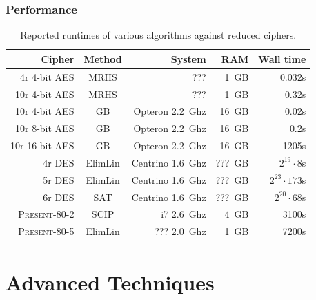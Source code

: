 \documentclass[9pt]{beamer}
\newcommand{\PRESENT}{\textsc{Present}\xspace}
\begin{document}
\begin{frame}
\frametitle{Performance} 

\begin{table}[htbp]
\begin{center}
\begin{tabular}{|r|c|r|r|r|}
\hline
Cipher & Method & System & RAM & Wall time\\
\hline
 4r 4-bit AES & MRHS  & ??? & 1~GB& 0.032s\\
10r 4-bit AES & MRHS  & ??? & 1~GB& 0.32s\\
10r 4-bit AES & GB & Opteron 2.2~Ghz & 16~GB & 0.02s\\
10r 8-bit AES  & GB & Opteron 2.2~Ghz & 16~GB & 0.2s\\
10r 16-bit AES & GB & Opteron 2.2~Ghz & 16~GB & 1205s\\
\hline
4r DES       & ElimLin  & Centrino 1.6~Ghz & ???~GB & $2^{19} \cdot 8$s\\
5r DES       & ElimLin  & Centrino 1.6~Ghz & ???~GB & $2^{23} \cdot 173$s\\
6r DES       & SAT  & Centrino 1.6~Ghz & ???~GB & $2^{20} \cdot 68$s\\
\hline
\PRESENT-80-2 & SCIP & i7 2.6~Ghz & 4~GB & 3100s \\
\PRESENT-80-5 & ElimLin & ??? 2.0~Ghz & 1~GB & 7200s \\
\hline
\end{tabular}
\end{center}
\caption{Reported runtimes of various algorithms against reduced ciphers.}
\label{tab:runtimes}
\end{table}
\end{frame}

\section{Advanced Techniques}
\end{document}
